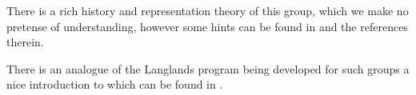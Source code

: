 \begin{example}
    
    
    There is a rich history and representation theory of this group, which we make no pretense of understanding, however some hints can be found in \cite{kudlaNOTESLOCALTHETA} and the references therein.
\end{example}

There is an analogue of the Langlands program being developed for such groups a nice introduction to which can be found in \cite{ganLgroupsLanglandsProgram2017}. 